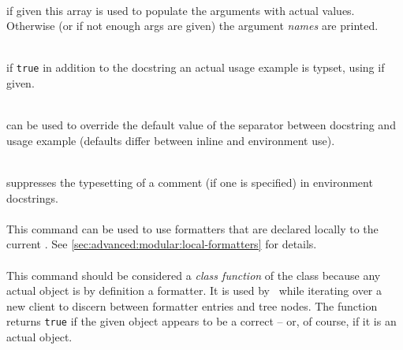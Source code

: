 \documentclass[12pt]{scrartcl}
\begin{document}
\begin{itemize*}
\item {}\\
if given this array is used to populate the arguments with actual values.
Otherwise (or if not enough args are given) the argument \emph{names} are
printed.

\item {}\\
if \texttt{true} in addition to the docstring an actual usage example is
typset, using  if given.

\item {}\\
can be used to override the default value of the separator between docstring
and usage example (defaults differ between inline and environment use).

\item {}\\
suppresses the typesetting of a comment (if one is specified) in environment
docstrings.
\end{itemize*}

\paragraph{}
\label{sec:advanced:formatter:format}

This command can be used to use formatters that are declared locally to the
current .  See \vref{sec:advanced:modular:local-formatters} for
details.

\paragraph{}
\label{sec:advanced:formatter:is-formatter}

This command should be considered a \emph{class function} of the
 class because any actual  object is by
definition a formatter.  It is used by \luaformatters\ while iterating over a new
client to discern between formatter entries and tree nodes.  The function
returns \texttt{true} if the given object appears to be a correct
 -- or, of course, if it is an actual
 object.


\paragraph{}
\label{sec:advanced:formatter:update}
\end{document}
